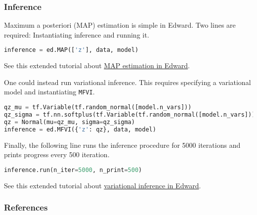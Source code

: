 \subsubsection{Inference}

Maximum a posteriori (MAP) estimation is simple in Edward. Two lines are
required: Instantiating inference and running it.
\begin{lstlisting}[language=Python]
inference = ed.MAP(['z'], data, model)
\end{lstlisting}

See this extended tutorial about
\href{/tutorials/map}{MAP estimation in Edward}.

One could instead run variational inference. This requires specifying
a variational model and instantiating \texttt{MFVI}.
\begin{lstlisting}[language=Python]
qz_mu = tf.Variable(tf.random_normal([model.n_vars]))
qz_sigma = tf.nn.softplus(tf.Variable(tf.random_normal([model.n_vars])))
qz = Normal(mu=qz_mu, sigma=qz_sigma)
inference = ed.MFVI({'z': qz}, data, model)
\end{lstlisting}
Finally, the following line runs the inference procedure for 5000
iterations and prints progress every 500 iteration.
\begin{lstlisting}[language=Python]
inference.run(n_iter=5000, n_print=500)
\end{lstlisting}
See this extended tutorial about
\href{/tutorials/variational-inference}{variational inference in Edward}.

\subsubsection{References}

